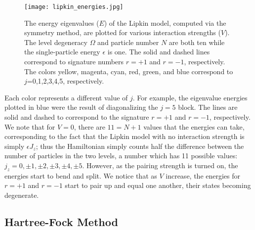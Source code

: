 \documentclass[Dual]{msu-thesis}
\begin{document}
\begin{figure}
    \centering
    \texttt{[image: lipkin\_energies.jpg]}
    \caption{The energy eigenvalues ($E$) of the Lipkin model, computed via the symmetry method, are plotted for various interaction strengths ($V$). The level degeneracy $\Omega$ and particle number $N$ are both ten while the single-particle energy $\epsilon$ is one. The solid and dashed lines correspond to signature numbers $r=+1$ and $r=-1$, respectively. The colors yellow, magenta, cyan, red, green, and blue correspond to $j$=0,1,2,3,4,5, respectively.}
    \label{fig:lipkin_energies}
\end{figure}
Each color represents a different value of $j$. For example, the eigenvalue energies plotted in blue were the result of diagonalizing the $j=5$ block. The lines are solid and dashed to correspond to the signature $r=+1$ and $r=-1$, respectively. We note that for $V=0$, there are $11=N+1$ values that the energies can take, corresponding to the fact that the Lipkin model with no interaction strength is simply $\epsilon J_z$; thus the Hamiltonian simply counts half the difference between the number of particles in the two levels, a number which has 11 possible values: $j_z=0,\pm1,\pm2,\pm3,\pm4,\pm5$. However, as the pairing strength is turned on, the energies start to bend and split. We notice that as $V$ increase, the energies for $r=+1$ and $r=-1$ start to pair up and equal one another, their states becoming degenerate. 

\subsection{Hartree-Fock Method}
\end{document}
